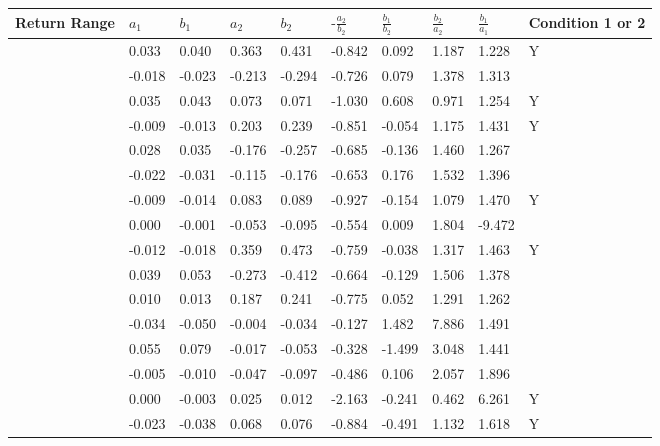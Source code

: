 \begin{table}[ht]
\centering
\begin{tabular}{llllllllll}
  \hline
Return Range & $a_1$ & $b_1$ & $a_2$ & $b_2$ & $\mbox{-}\frac{a_2}{b_2}$ & $\frac{b_1}{b_2}$ & $\frac{b_2}{a_2}$ & $\frac{b_1}{a_1}$ & Condition 1 or 2 \\ 
  \hline
  [-0.805,-0.795] &  0.033 &  0.040 &  0.363 &  0.431 &  -0.842 &   0.092 &   1.187 &   1.228 & Y \\ 
  [-0.795,-0.785] & -0.018 & -0.023 & -0.213 & -0.294 &  -0.726 &   0.079 &   1.378 &   1.313 &  \\ 
  [-0.785,-0.775] &  0.035 &  0.043 &  0.073 &  0.071 &  -1.030 &   0.608 &   0.971 &   1.254 & Y \\ 
  [-0.775,-0.765] & -0.009 & -0.013 &  0.203 &  0.239 &  -0.851 &  -0.054 &   1.175 &   1.431 & Y \\ 
  [-0.765,-0.755] &  0.028 &  0.035 & -0.176 & -0.257 &  -0.685 &  -0.136 &   1.460 &   1.267 &  \\ 
  [-0.755,-0.745] & -0.022 & -0.031 & -0.115 & -0.176 &  -0.653 &   0.176 &   1.532 &   1.396 &  \\ 
  [-0.745,-0.735] & -0.009 & -0.014 &  0.083 &  0.089 &  -0.927 &  -0.154 &   1.079 &   1.470 & Y \\ 
  [-0.735,-0.725] &  0.000 & -0.001 & -0.053 & -0.095 &  -0.554 &   0.009 &   1.804 &  -9.472 &  \\ 
  [-0.725,-0.715] & -0.012 & -0.018 &  0.359 &  0.473 &  -0.759 &  -0.038 &   1.317 &   1.463 & Y \\ 
  [-0.715,-0.705] &  0.039 &  0.053 & -0.273 & -0.412 &  -0.664 &  -0.129 &   1.506 &   1.378 &  \\ 
  [-0.705,-0.695] &  0.010 &  0.013 &  0.187 &  0.241 &  -0.775 &   0.052 &   1.291 &   1.262 &  \\ 
  [-0.695,-0.685] & -0.034 & -0.050 & -0.004 & -0.034 &  -0.127 &   1.482 &   7.886 &   1.491 &  \\ 
  [-0.685,-0.675] &  0.055 &  0.079 & -0.017 & -0.053 &  -0.328 &  -1.499 &   3.048 &   1.441 &  \\ 
  [-0.675,-0.665] & -0.005 & -0.010 & -0.047 & -0.097 &  -0.486 &   0.106 &   2.057 &   1.896 &  \\ 
  [-0.665,-0.655] &  0.000 & -0.003 &  0.025 &  0.012 &  -2.163 &  -0.241 &   0.462 &   6.261 & Y \\ 
  [-0.655,-0.645] & -0.023 & -0.038 &  0.068 &  0.076 &  -0.884 &  -0.491 &   1.132 &   1.618 & Y \\ 

\end{tabular}
\end{table}
